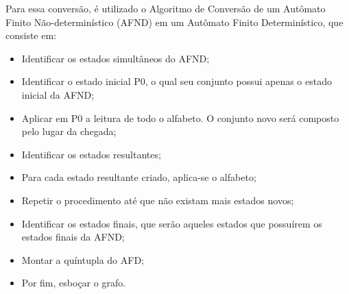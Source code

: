 \documentclass[a4paper,10pt]{article} %
\begin{document}
Para essa conversão, é utilizado o Algoritmo de Conversão de um Autômato Finito Não-determinístico (AFND) em um Autômato Finito Determinístico, que consiste em:
    \begin{itemize}
        \item Identificar os estados simultâneos do AFND;
        \item Identificar o estado inicial P0, o qual seu conjunto possui apenas o estado inicial da AFND;
        \item Aplicar em P0 a leitura de todo o alfabeto. O conjunto novo será composto pelo lugar da chegada;
        \item Identificar os estados resultantes;
        \item Para cada estado resultante criado, aplica-se o alfabeto;
        \item Repetir o procedimento até que não existam mais estados novos;
        \item Identificar os estados finais, que serão aqueles estados que possuírem os estados finais da AFND;     
        \item Montar a quíntupla do AFD;     
        \item Por fim, esboçar o grafo.    
    \end{itemize}
\end{document}
